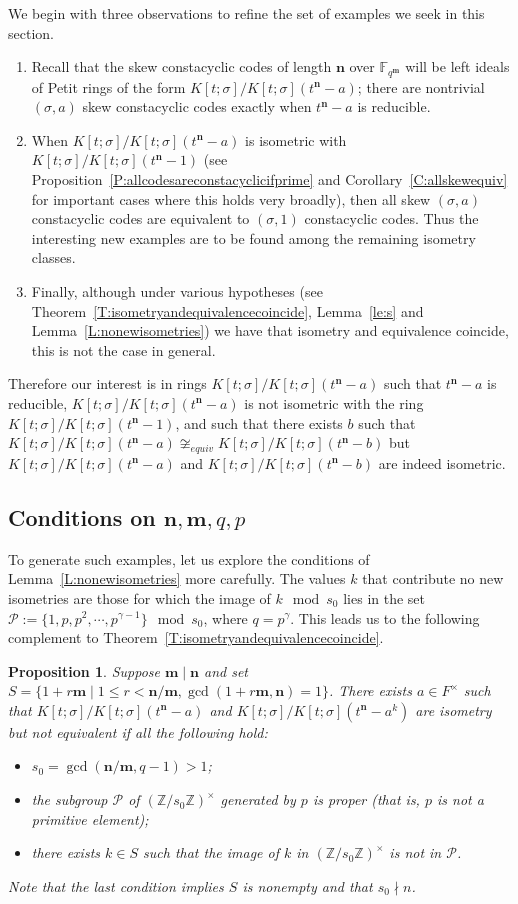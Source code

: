 \documentclass[11pt]{amsart}
\theoremstyle{plain}
\newtheorem{proposition}[theorem]{Proposition}
\theoremstyle{definition}
\numberwithin{equation}{section}
\numberwithin{figure}{section}
\newcommand{\ZZ}{\mathbb{Z}}
\newcommand{\Kone}[1]{K[t;\sigma]/K[t;\sigma](t^{\de}-#1)}
\newcommand{\os}{{\mathbf{m}}}  %
\newcommand{\de}{{\mathbf{n}}}  %
\begin{document}
We begin with three observations to refine the set of examples we seek in this section.
\begin{enumerate}[1.]
\item Recall that the skew constacyclic codes of length $\de$  over $\mathbb{F}_{q^\os}$ will be left  ideals of  Petit rings of the form $\Kone{a}$; there are nontrivial $(\sigma,a)$ skew constacyclic codes exactly when  $t^\de-a$ is reducible.

\item When $\Kone{a}$ is isometric with $\Kone{1}$ (see Proposition~\ref{P:allcodesareconstacyclicifprime} and Corollary~\ref{C:allskewequiv} for important cases where this holds very broadly), then
all skew $(\sigma,a)$ constacyclic codes are equivalent to $(\sigma,1)$ constacyclic codes. Thus the interesting new examples are to be found among the remaining isometry classes.

\item Finally, although under various hypotheses (see Theorem~\ref{T:isometryandequivalencecoincide}, Lemma~\ref{le:s} and Lemma~\ref{L:nonewisometries})  we have that isometry and equivalence coincide, this is not the case in general.
\end{enumerate}

Therefore our interest is in rings $\Kone{a}$ such that $t^\de-a$ is reducible, $\Kone{a}$ is not isometric with the ring $\Kone{1}$, and such that there exists $b$ such that $\Kone{a}\not\cong_{equiv}\Kone{b}$ but $\Kone{a}$ and $\Kone{b}$ are indeed isometric.

\subsection{Conditions on \texorpdfstring{$\de,\os,q,p$}{m,n,q,p}}
To generate such examples, let us explore the conditions of Lemma~\ref{L:nonewisometries} more carefully.  The values $k$ that contribute no new isometries are those for which the image of $k\mod s_0$ lies in the set $\mathscr{P}:=\{1,p,p^2,\cdots,p^{\gamma-1}\}\mod s_0$, where   $q=p^\gamma$.  This leads us to the following complement to Theorem~\ref{T:isometryandequivalencecoincide}.


\begin{proposition}\label{prop:proper equivalences}
    Suppose $\os\mid\de$ and set $S = \{ 1+r\os \mid 1\leq r < \de/\os, \gcd(1+r\os,\de)=1\}$.  There exists $a\in F^\times$ such that $\Kone{a}$ and $\Kone{a^k}$ are isometry but not equivalent if
    all the following hold:
    \begin{itemize}
        \item $s_0=\gcd(\de/\os,q-1)>1$;
        \item the subgroup $\mathscr{P}$ of $(\ZZ/s_0\ZZ)^\times$ generated by $p$ is proper (that is, $p$ is not a primitive element);
        \item there exists $k\in S$ %
        such that the image of $k$ in $(\ZZ/s_0\ZZ)^\times$ is not in $\mathscr{P}$.
    \end{itemize}
    Note that the last condition implies $S$ is nonempty and that $s_0\nmid n$.
\end{proposition}
\end{document}
